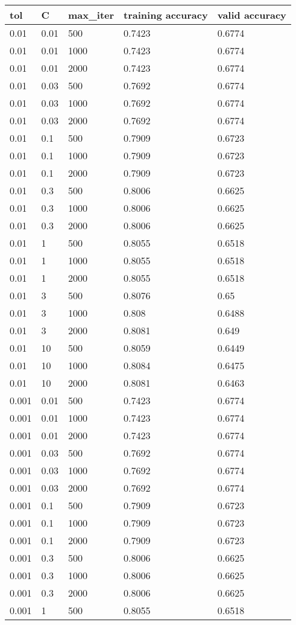 \documentclass{article}%
\begin{document}
%
\normalsize%
\begin{longtable}{l l l l l}%
\hline%
tol&C&max\_iter&training accuracy&valid accuracy\\%
\hline%
\endhead%
\hline%
0.01&0.01&500&0.7423&0.6774\\%
0.01&0.01&1000&0.7423&0.6774\\%
0.01&0.01&2000&0.7423&0.6774\\%
0.01&0.03&500&0.7692&0.6774\\%
0.01&0.03&1000&0.7692&0.6774\\%
0.01&0.03&2000&0.7692&0.6774\\%
0.01&0.1&500&0.7909&0.6723\\%
0.01&0.1&1000&0.7909&0.6723\\%
0.01&0.1&2000&0.7909&0.6723\\%
0.01&0.3&500&0.8006&0.6625\\%
0.01&0.3&1000&0.8006&0.6625\\%
0.01&0.3&2000&0.8006&0.6625\\%
0.01&1&500&0.8055&0.6518\\%
0.01&1&1000&0.8055&0.6518\\%
0.01&1&2000&0.8055&0.6518\\%
0.01&3&500&0.8076&0.65\\%
0.01&3&1000&0.808&0.6488\\%
0.01&3&2000&0.8081&0.649\\%
0.01&10&500&0.8059&0.6449\\%
0.01&10&1000&0.8084&0.6475\\%
0.01&10&2000&0.8081&0.6463\\%
0.001&0.01&500&0.7423&0.6774\\%
0.001&0.01&1000&0.7423&0.6774\\%
0.001&0.01&2000&0.7423&0.6774\\%
0.001&0.03&500&0.7692&0.6774\\%
0.001&0.03&1000&0.7692&0.6774\\%
0.001&0.03&2000&0.7692&0.6774\\%
0.001&0.1&500&0.7909&0.6723\\%
0.001&0.1&1000&0.7909&0.6723\\%
0.001&0.1&2000&0.7909&0.6723\\%
0.001&0.3&500&0.8006&0.6625\\%
0.001&0.3&1000&0.8006&0.6625\\%
0.001&0.3&2000&0.8006&0.6625\\%
0.001&1&500&0.8055&0.6518\\%

\end{longtable}
\end{document}
